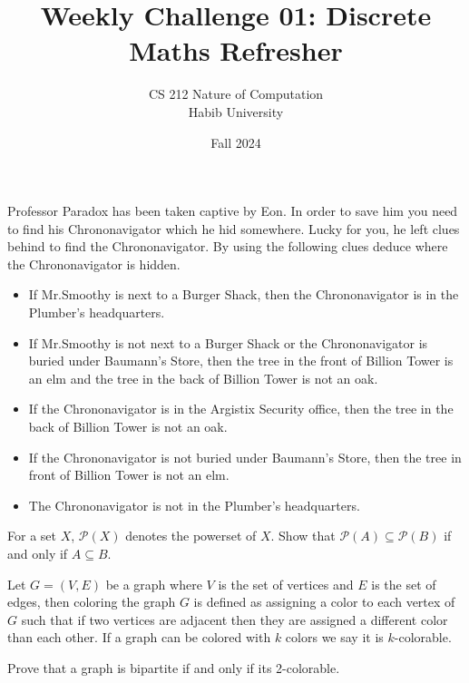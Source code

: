 \documentclass[a4paper]{exam}
\title{Weekly Challenge 01: Discrete Maths Refresher}
\author{CS 212 Nature of Computation\\Habib University}
\date{Fall 2024}
\begin{document}
\maketitle

\begin{questions}
  
Professor Paradox has been taken captive by Eon. In order to save him you need to find his Chrononavigator which he hid somewhere.
Lucky for you, he left clues behind to find the Chrononavigator. By using the following clues deduce where the Chrononavigator is hidden.
\begin{itemize}
    \item If Mr.Smoothy is next to a Burger Shack, then the Chrononavigator is in the Plumber's headquarters.
    \item If Mr.Smoothy is not next to a Burger Shack or the Chrononavigator is buried under Baumann's Store, then the tree in the front of Billion Tower is an elm and the tree in the back of Billion Tower is not an oak.
    \item If the Chrononavigator is in the Argistix Security office, then the tree in the back of Billion Tower is not an oak.
    \item If the Chrononavigator is not buried under Baumann's Store, then the tree in front of Billion Tower is not an elm.
    \item The Chrononavigator is not in the Plumber's headquarters.
\end{itemize}

For a set $X$, $\mathcal{P}(X)$ denotes the powerset of $X$.
Show that $ \mathcal{P}(A) \subseteq \mathcal {P}(B)$ if and only if $ A \subseteq B$.
\begin{solution}
    
\end{solution}


Let $G = (V, E)$ be a graph where $V$ is the set of vertices and $E$ is the set of edges, then
coloring the graph $G$ is defined as assigning a color to each vertex of $G$ such that if two vertices are adjacent then they are assigned a different color than each other. 
If a graph can be colored with $k$ colors we say it is $k$-colorable.

Prove that a graph is bipartite if and only if its 2-colorable.
\begin{solution}

\end{solution}

 

\end{questions}
\end{document}
